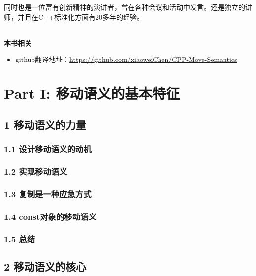 \documentclass[11pt,a4paper,UTF8]{ctexart}
\begin{document}
	同时也是一位富有创新精神的演讲者，曾在各种会议和活动中发言。还是独立的讲师，并且在C++标准化方面有20多年的经验。\par
	
	\hspace*{\fill} \\ %
	\noindent\textbf{本书相关}\ \par
	\begin{itemize}
		\item github翻译地址：\href{https://github.com/xiaoweiChen/CPP-Move-Semantics}{https://github.com/xiaoweiChen/CPP-Move-Semantics}
	\end{itemize}
	\newpage
	
	\tableofcontents
	\newpage
	
	\pagestyle{empty}
	
	

	\section{Part I: 移动语义的基本特征}
	
	\subsection{1 移动语义的力量}
	
		\subsubsection{1.1 设计移动语义的动机}
		
		\subsubsection{1.2 实现移动语义}
		
		\subsubsection{1.3 复制是一种应急方式}
		
		\subsubsection{1.4 const对象的移动语义}
		
		\subsubsection{1.5 总结}
		
	\subsection{2 移动语义的核心}
	
\end{document}
